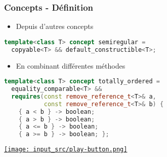 \documentclass[C++.tex]{subfiles}
\begin{document}
\begin{frame}[fragile]
	\frametitle{Concepts - Définition}
	\begin{itemize}
		\item Depuis d'autres concepts
	\end{itemize}

	\begin{lstlisting}[language=C++]
template<class T> concept semiregular = 
  copyable<T> && default_constructible<T>;\end{lstlisting}

	\begin{itemize}
		\item En combinant différentes méthodes
	\end{itemize}

	\begin{lstlisting}[language=C++]
template<class T> concept totally_ordered =
  equality_comparable<T> &&
  requires(const remove_reference_t<T>& a,
           const remove_reference_t<T>& b) {
    { a < b } -> boolean;
    { a > b } -> boolean;
    { a <= b } -> boolean;
    { a >= b } -> boolean; };\end{lstlisting}

	\hfill
	\href{https://godbolt.org/#g:!((g:!((g:!((h:codeEditor,i:(filename:'1',fontScale:14,fontUsePx:'0',j:1,lang:c%2B%2B,selection:(endColumn:1,endLineNumber:21,positionColumn:1,positionLineNumber:21,selectionStartColumn:1,selectionStartLineNumber:21,startColumn:1,startLineNumber:21),source:'%23include+%3Ciostream%3E%0A%0Atemplate%3Ctypename+T%3E%0Aconcept+Foo+%3D+requires+(T+x)+%7B+x+%2B+x%3B+%7D%3B%0A%0Atemplate%3CFoo+T%3E%0AT+foo(T+a,+T+b)%0A%7B%0A++return+a+%2B+b%3B%0A%7D%0A%0Aint+main()%0A%7B%0A++std::cout+%3C%3C+foo(5,+2)+%3C%3C+%22%5Cn%22%3B%0A%0A%23if+0%0A++int+*bar,+*baz%3B%0A++std::cout+%3C%3C+foo(bar,+baz)+%3C%3C+%22%5Cn%22%3B%0A%23endif%0A%7D%0A'),l:'5',n:'0',o:'C%2B%2B+source+%231',t:'0')),k:50,l:'4',n:'0',o:'',s:0,t:'0'),(g:!((h:executor,i:(argsPanelShown:'1',compilationPanelShown:'0',compiler:g112,compilerName:'',compilerOutShown:'0',execArgs:'',execStdin:'',fontScale:14,fontUsePx:'0',j:1,lang:c%2B%2B,libs:!((name:boost,ver:'175')),options:'-std%3Dc%2B%2B20+-Wall+-Wextra+-pedantic',source:1,stdinPanelShown:'1',tree:'1',wrap:'0'),l:'5',n:'0',o:'Executor+x86-64+gcc+11.2+(C%2B%2B,+Editor+%231)',t:'0')),header:(),k:50,l:'4',n:'0',o:'',s:0,t:'0')),l:'2',n:'0',o:'',t:'0')),version:4}{\texttt{[image: input\_src/play-button.png]}}
\end{frame}
\end{document}
